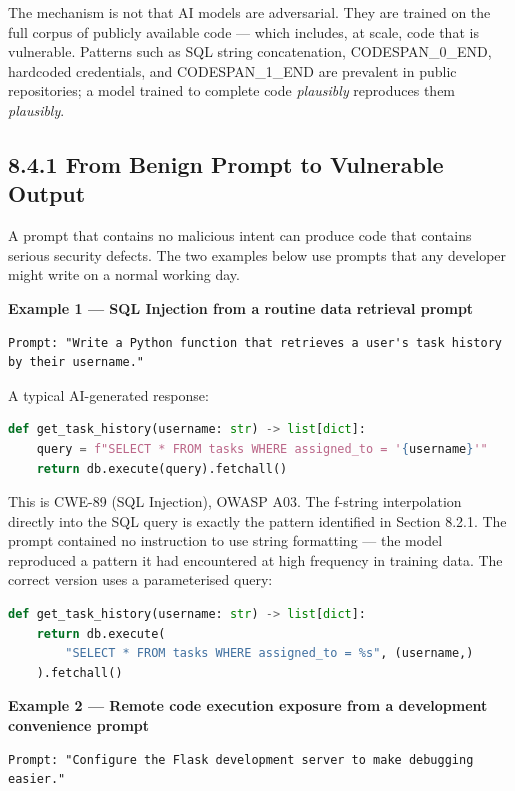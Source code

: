 \documentclass[11pt,a4paper]{book}
\begin{document}
The mechanism is not that AI models are adversarial. They are trained on the full corpus of publicly available code --- which includes, at scale, code that is vulnerable. Patterns such as SQL string concatenation, CODESPAN\_0\_END, hardcoded credentials, and CODESPAN\_1\_END are prevalent in public repositories; a model trained to complete code \textit{plausibly} reproduces them \textit{plausibly}.

\subsection{8.4.1 From Benign Prompt to Vulnerable Output}

A prompt that contains no malicious intent can produce code that contains serious security defects. The two examples below use prompts that any developer might write on a normal working day.

\textbf{Example 1 --- SQL Injection from a routine data retrieval prompt}

\begin{lstlisting}
Prompt: "Write a Python function that retrieves a user's task history by their username."
\end{lstlisting}

A typical AI-generated response:

\begin{lstlisting}[language=Python]
def get_task_history(username: str) -> list[dict]:
    query = f"SELECT * FROM tasks WHERE assigned_to = '{username}'"
    return db.execute(query).fetchall()
\end{lstlisting}

This is CWE-89 (SQL Injection), OWASP A03. The f-string interpolation directly into the SQL query is exactly the pattern identified in Section 8.2.1. The prompt contained no instruction to use string formatting --- the model reproduced a pattern it had encountered at high frequency in training data. The correct version uses a parameterised query:

\begin{lstlisting}[language=Python]
def get_task_history(username: str) -> list[dict]:
    return db.execute(
        "SELECT * FROM tasks WHERE assigned_to = %s", (username,)
    ).fetchall()
\end{lstlisting}

\textbf{Example 2 --- Remote code execution exposure from a development convenience prompt}

\begin{lstlisting}
Prompt: "Configure the Flask development server to make debugging easier."
\end{lstlisting}
\end{document}
